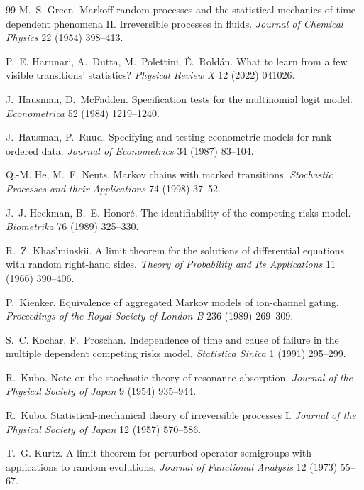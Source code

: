 \documentclass[11pt]{article}
\theoremstyle{remark}
\begin{document}
\begin{thebibliography}{99}
 M.~S. Green. Markoff random processes and the
statistical mechanics of time-dependent phenomena II. Irreversible processes in
fluids. \emph{Journal of Chemical Physics} 22 (1954) 398--413.

 P.~E. Harunari, A.~Dutta, M.~Polettini, \'E.~Rold\'an.
What to learn from a few visible transitions' statistics? \emph{Physical
Review X} 12 (2022) 041026.

 J.~Hausman, D.~McFadden.
Specification tests for the multinomial logit model. \emph{Econometrica} 52
(1984) 1219--1240.

 J.~Hausman, P.~Ruud.
Specifying and testing econometric models for rank-ordered data.
\emph{Journal of Econometrics} 34 (1987) 83--104.

 Q.-M. He, M.~F. Neuts. Markov
chains with marked transitions. \emph{Stochastic Processes and their
Applications} 74 (1998) 37--52.

 J.~J. Heckman, B.~E.
Honor\'e. The identifiability of the competing risks model. \emph{Biometrika}
76 (1989) 325--330.

 R.~Z. Khas'minskii. A limit
theorem for the solutions of differential equations with random right-hand
sides. \emph{Theory of Probability and Its Applications} 11 (1966) 390--406.

 P.~Kienker. Equivalence of aggregated
Markov models of ion-channel gating. \emph{Proceedings of the Royal Society of
London B} 236 (1989) 269--309.

 S.~C. Kochar, F.~Proschan.
Independence of time and cause of failure in the multiple dependent competing
risks model. \emph{Statistica Sinica} 1 (1991) 295--299.

 R.~Kubo. Note on the stochastic theory of
resonance absorption. \emph{Journal of the Physical Society of Japan} 9 (1954)
935--944.

 R.~Kubo. Statistical-mechanical theory of
irreversible processes I. \emph{Journal of the Physical Society of Japan} 12
(1957) 570--586.

 T.~G. Kurtz. A limit theorem for perturbed
operator semigroups with applications to random evolutions. \emph{Journal of
Functional Analysis} 12 (1973) 55--67.


\end{thebibliography}
\end{document}
